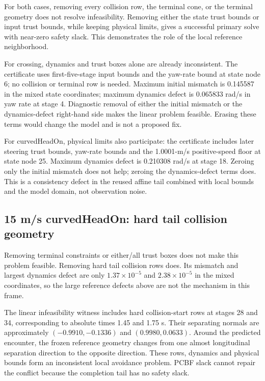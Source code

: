 \documentclass[11pt]{article}
\begin{document}
For both cases, removing every collision row, the terminal cone, or the
terminal geometry does not resolve infeasibility. Removing either the state
trust bounds or input trust bounds, while keeping physical limits, gives a
successful primary solve with near-zero safety slack. This demonstrates the
role of the local reference neighborhood.

For crossing, dynamics and trust boxes alone are already inconsistent. The
certificate uses first-five-stage input bounds and the yaw-rate bound at
state node 6; no collision or terminal row is needed. Maximum initial mismatch
is 0.145587 in the mixed state coordinates; maximum dynamics defect is
0.065833 rad/s in yaw rate at stage 4. Diagnostic removal of either the initial
mismatch or the dynamics-defect right-hand side makes the linear problem
feasible. Erasing these terms would change the model and is not a proposed fix.

For curvedHeadOn, physical limits also participate: the certificate includes
later steering trust bounds, yaw-rate bounds and the 1.0001-m/s positive-speed
floor at state node 25. Maximum dynamics defect is 0.210308 rad/s at stage 18.
Zeroing only the initial mismatch does not help; zeroing the dynamics-defect
terms does. This is a consistency defect in the reused affine tail combined
with local bounds and the model domain, not observation noise.

\subsection{15 m/s curvedHeadOn: hard tail collision geometry}
Removing terminal constraints or either/all trust boxes does not make this
problem feasible. Removing hard tail collision rows does. Its mismatch and
largest dynamics defect are only $1.37\times10^{-5}$ and $2.38\times10^{-5}$
in the mixed coordinates, so the large reference defects above are not the
mechanism in this frame.

The linear infeasibility witness includes hard collision-start rows at
stages 28 and 34, corresponding to absolute times 1.45 and 1.75 s. Their
separating normals are approximately $(-0.9910,-0.1336)$ and
$(0.9980,0.0633)$. Around the predicted encounter, the frozen reference
geometry changes from one almost longitudinal separation direction to the
opposite direction. These rows, dynamics and physical bounds form an
inconsistent local avoidance problem. PCBF slack cannot repair the conflict
because the completion tail has no safety slack.
\end{document}
